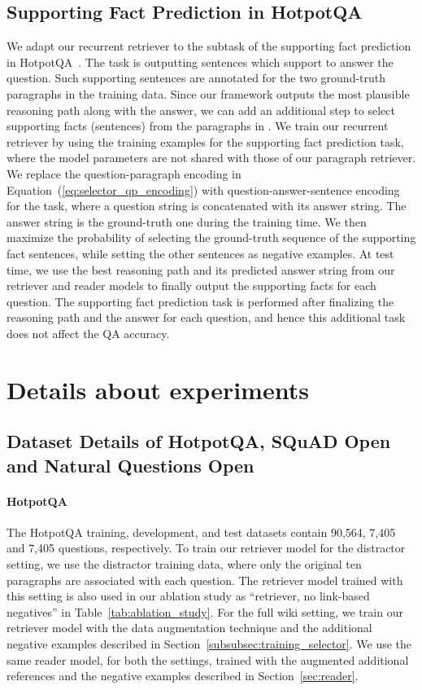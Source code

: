 \documentclass{article} \usepackage{iclr2020_conference,times}
\begin{document}
\subsection{Supporting Fact Prediction in HotpotQA}
\label{subsec:appendix_sp}

We adapt our recurrent retriever to the subtask of the supporting fact prediction in HotpotQA~\citep{yang-etal-2018-hotpotqa}.
The task is outputting sentences which support to answer the question.
Such supporting sentences are annotated for the two ground-truth paragraphs in the training data.
Since our framework outputs the most plausible reasoning path  along with the answer, we can add an additional step to select supporting facts (sentences) from the paragraphs in .
We train our recurrent retriever by using the training examples for the supporting fact prediction task, where the model parameters are not shared with those of our paragraph retriever.
We replace the question-paragraph encoding in Equation~(\ref{eq:selector_qp_encoding}) with question-answer-sentence encoding for the task, where a question string is concatenated with its answer string.
The answer string is the ground-truth one during the training time.
We then maximize the probability of selecting the ground-truth sequence of the supporting fact sentences, while setting the other sentences as negative examples.
At test time, we use the best reasoning path and its predicted answer string from our retriever and reader models to finally output the supporting facts for each question.
The supporting fact prediction task is performed after finalizing the reasoning path and the answer for each question, and hence this additional task does not affect the QA accuracy.

\section{Details about experiments}
\label{sec:appendix_experimental_details}

\subsection{Dataset Details of HotpotQA, SQuAD Open and Natural Questions Open}


\paragraph{HotpotQA}
The HotpotQA training, development, and test datasets contain 90,564, 7,405 and 7,405 questions, respectively.
To train our retriever model for the distractor setting, we use the distractor training data, where only the original ten paragraphs are associated with each question.
The retriever model trained with this setting is also used in our ablation study as ``retriever, no link-based negatives'' in Table~\ref{tab:ablation_study}.
For the full wiki setting, we train our retriever model with the data augmentation technique and the additional negative examples described in Section~\ref{subsubsec:training_selector}.
We use the same reader model, for both the settings, trained with the augmented additional references and the negative examples described in Section~\ref{sec:reader}.
\end{document}
